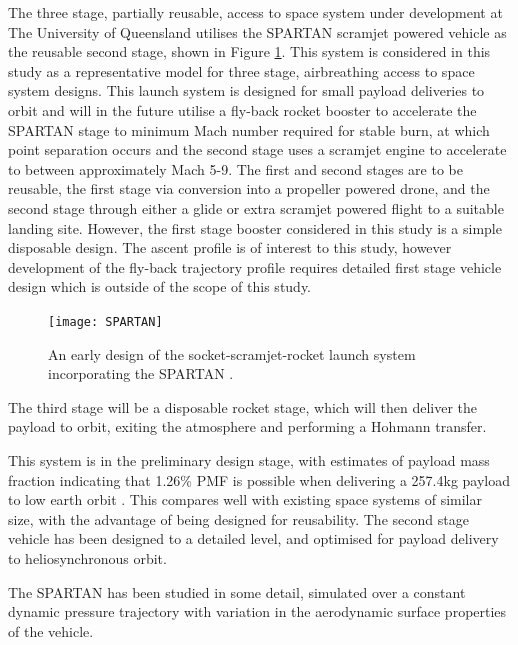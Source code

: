 The three stage, partially reusable, access to space system under development at The University of Queensland utilises the SPARTAN\cite{Jazra2013} scramjet powered vehicle as the reusable second stage, shown in Figure \ref{fig:SPARTAN}. This system is considered in this study as a representative model for three stage, airbreathing access to space system designs. This launch system is designed for small payload deliveries to orbit and will in the future utilise a fly-back rocket booster to accelerate the SPARTAN stage to minimum Mach number required for stable burn, at which point separation occurs and the second stage uses a scramjet engine to accelerate to between approximately Mach 5-9. The first and second stages are to be reusable, the first stage via conversion into a propeller powered drone, and the second stage through either a glide or extra scramjet powered flight to a suitable landing site. However, the first stage booster considered in this study is a simple disposable design. The ascent profile is of interest to this study, however development of the fly-back trajectory profile requires detailed first stage vehicle design which is outside of the scope of this study. 

\begin{figure}[ht]
	\centering
	\texttt{[image: SPARTAN]}
	\caption{An early design of the socket-scramjet-rocket launch system incorporating the SPARTAN \cite{Jazra2013}.}
	\label{fig:SPARTAN}
\end{figure}

The third stage will be a disposable rocket stage, which will then deliver the payload to orbit, exiting the atmosphere and performing a Hohmann transfer. 

This system is in the preliminary design stage, with estimates of  payload mass fraction indicating that 1.26\% PMF is possible when delivering a 257.4kg payload to low earth orbit \cite{Preller2015a}. This compares well with existing space systems of similar size, with the advantage of being designed for reusability. The second stage vehicle has been designed to a detailed level, and optimised for payload delivery to heliosynchronous orbit.

The SPARTAN has been studied in some detail, simulated over a constant dynamic pressure trajectory with variation in the aerodynamic surface properties of the vehicle. 

